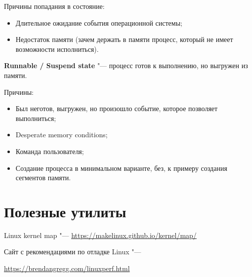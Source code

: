\documentclass[bachelor, och, book]{SCWorks}
\theoremstyle{remark}
\begin{document}
    Причины попадания в состояние:

    \begin{itemize}[label=$\bullet$]
        \item Длительное ожидание события операционной системы;
        \item Недостаток памяти (зачем держать в памяти процесс, который не имеет возможности исполниться).
    \end{itemize}

    \hfill \break
    \textbf{Runnable / Suspend state} "--- процесс готов к выполнению, но выгружен из памяти.

    Причины:

    \begin{itemize}[label=$\bullet$]
        \item Был неготов, выгружен, но произошло событие, которое позволяет выполниться;
        \item Desperate memory conditions;
        \item Команда пользователя;
        \item Создание процесса в минимальном варианте, без, к примеру создания сегментов памяти.
    \end{itemize}


    \section{Полезные утилиты}

    Linux kernel map "--- \href{https://makelinux.github.io/kernel/map/}{https://makelinux.github.io/kernel/map/}

    Сайт с рекомендациями  по отладке Linux "--- 
    
    \href{https://brendangregg.com/linuxperf.html}{https://brendangregg.com/linuxperf.html}
\end{document}
